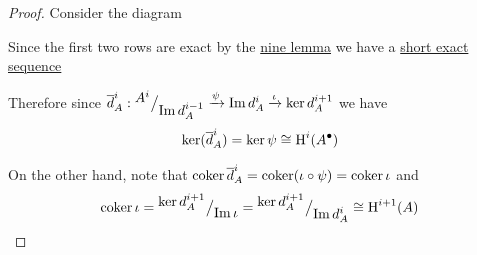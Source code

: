 \documentclass[../../../main]{subfiles}
\begin{document}
\begin{proof}
  Consider the diagram
  \begin{center}
  \end{center}
  Since the first two rows are exact by the \hyperref[thm:nine-lemma]{nine lemma} we have a \hyperref[def:short-exact-sequence]{short exact sequence}
  \begin{center}
  \end{center}
  Therefore since \(\overline{d}_{A}^{i}: {^{\textstyle A^{i}}\big/_{\textstyle \operatorname*{Im} d_{A}^{i-1}}} \xrightarrow{\psi} \operatorname*{Im} d_{A}^{i} \xrightarrow{\iota} \ker d_{A}^{i+1}\) we have
  \begin{align*}
    \ker (\overline{d}_{A}^{i}) = \ker \psi \cong \operatorname{H}^{i}(A^{\bullet})
  \end{align*}

  On the other hand, note that \(\operatorname*{coker} \overline{d}_{A}^{i} = \operatorname*{coker} (\iota \circ \psi) = \operatorname*{coker} \iota\) and
  \begin{align*}
    \operatorname*{coker} \iota = {^{\textstyle \ker d_{A}^{i+1}}\big/_{\textstyle \operatorname*{Im} \iota}} = {^{\textstyle \ker d_{A}^{i+1}}\big/_{\textstyle \operatorname*{Im} d_{A}^{i}}} \cong \operatorname{H}^{i+1}(A)
  \end{align*}
\end{proof}
\end{document}

